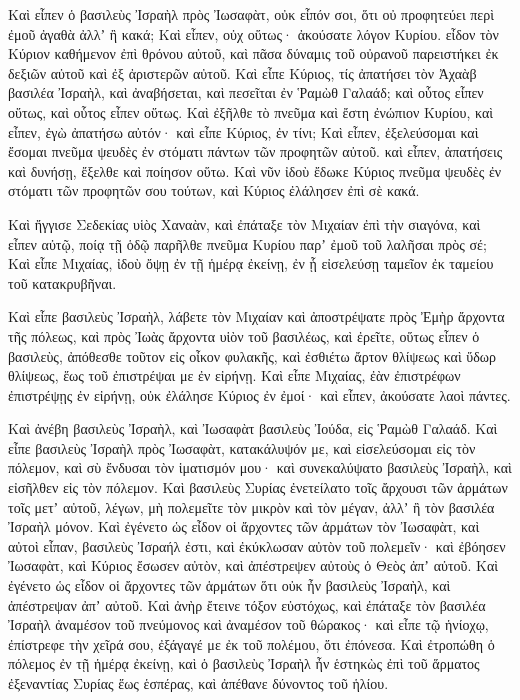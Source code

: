{\par }{\PP {}Καὶ εἶπεν ὁ βασιλεὺς Ἰσραὴλ πρὸς Ἰωσαφὰτ, οὐκ εἶπόν σοι, ὅτι οὐ προφητεύει περὶ ἐμοῦ ἀγαθὰ ἀλλʼ ἢ κακά;
Καὶ εἶπεν, οὐχ οὕτως· ἀκούσατε λόγον Κυρίου. εἶδον τὸν Κύριον καθήμενον ἐπὶ θρόνου αὐτοῦ, καὶ πᾶσα δύναμις τοῦ οὐρανοῦ παρειστήκει ἐκ δεξιῶν αὐτοῦ καὶ ἐξ ἀριστερῶν αὐτοῦ.
Καὶ εἶπε Κύριος, τίς ἀπατήσει τὸν Ἀχαὰβ βασιλέα Ἰσραὴλ, καὶ ἀναβήσεται, καὶ πεσεῖται ἐν Ῥαμὼθ Γαλαάδ; καὶ οὗτος εἶπεν οὕτως, καὶ οὗτος εἶπεν οὕτως.
Καὶ ἐξῆλθε τὸ πνεῦμα καὶ ἔστη ἐνώπιον Κυρίου, καὶ εἶπεν, ἐγὼ ἀπατήσω αὐτόν· καὶ εἶπε Κύριος, ἐν τίνι;
Καὶ εἶπεν, ἐξελεύσομαι καὶ ἔσομαι πνεῦμα ψευδὲς ἐν στόματι πάντων τῶν προφητῶν αὐτοῦ. καὶ εἶπεν, ἀπατήσεις καὶ δυνήσῃ, ἔξελθε καὶ ποίησον οὕτω.
Καὶ νῦν ἰδοὺ ἔδωκε Κύριος πνεῦμα ψευδὲς ἐν στόματι τῶν προφητῶν σου τούτων, καὶ Κύριος ἐλάλησεν ἐπὶ σὲ κακά.
\par }{\PP {}Καὶ ἤγγισε Σεδεκίας υἱὸς Χαναὰν, καὶ ἐπάταξε τὸν Μιχαίαν ἐπὶ τὴν σιαγόνα, καὶ εἶπεν αὐτῷ, ποίᾳ τῇ ὁδῷ παρῆλθε πνεῦμα Κυρίου παρʼ ἐμοῦ τοῦ λαλῆσαι πρὸς σέ;
Καὶ εἶπε Μιχαίας, ἰδοὺ ὄψῃ ἐν τῇ ἡμέρᾳ ἐκείνῃ, ἐν ᾗ εἰσελεύσῃ ταμεῖον ἐκ ταμείου τοῦ κατακρυβῆναι.
\par }{\PP {}Καὶ εἶπε βασιλεὺς Ἰσραὴλ, λάβετε τὸν Μιχαίαν καὶ ἀποστρέψατε πρὸς Ἐμὴρ ἄρχοντα τῆς πόλεως, καὶ πρὸς Ἰωὰς ἄρχοντα υἱὸν τοῦ βασιλέως,
καὶ ἐρεῖτε, οὕτως εἶπεν ὁ βασιλεὺς, ἀπόθεσθε τοῦτον εἰς οἶκον φυλακῆς, καὶ ἐσθιέτω ἄρτον θλίψεως καὶ ὕδωρ θλίψεως, ἕως τοῦ ἐπιστρέψαι με ἐν εἰρήνῃ.
Καὶ εἶπε Μιχαίας, ἐὰν ἐπιστρέφων ἐπιστρέψῃς ἐν εἰρήνῃ, οὐκ ἐλάλησε Κύριος ἐν ἐμοί· καὶ εἶπεν, ἀκούσατε λαοὶ πάντες.
\par }{\PP {}Καὶ ἀνέβη βασιλεὺς Ἰσραὴλ, καὶ Ἰωσαφὰτ βασιλεὺς Ἰούδα, εἰς Ῥαμὼθ Γαλαάδ.
Καὶ εἶπε βασιλεὺς Ἰσραὴλ πρὸς Ἰωσαφὰτ, κατακάλυψόν με, καὶ εἰσελεύσομαι εἰς τὸν πόλεμον, καὶ σὺ ἔνδυσαι τὸν ἱματισμόν μου· καὶ συνεκαλύψατο βασιλεὺς Ἰσραὴλ, καὶ εἰσῆλθεν εἰς τὸν πόλεμον.
Καὶ βασιλεὺς Συρίας ἐνετείλατο τοῖς ἄρχουσι τῶν ἁρμάτων τοῖς μετʼ αὐτοῦ, λέγων, μὴ πολεμεῖτε τὸν μικρὸν καὶ τὸν μέγαν, ἀλλʼ ἢ τὸν βασιλέα Ἰσραὴλ μόνον.
Καὶ ἐγένετο ὡς εἶδον οἱ ἄρχοντες τῶν ἁρμάτων τὸν Ἰωσαφὰτ, καὶ αὐτοὶ εἶπαν, βασιλεὺς Ἰσραήλ ἐστι, καὶ ἐκύκλωσαν αὐτὸν τοῦ πολεμεῖν· καὶ ἐβόησεν Ἰωσαφὰτ, καὶ Κύριος ἔσωσεν αὐτὸν, καὶ ἀπέστρεψεν αὐτοὺς ὁ Θεὸς ἀπʼ αὐτοῦ.
Καὶ ἐγένετο ὡς εἶδον οἱ ἄρχοντες τῶν ἁρμάτων ὅτι οὐκ ἦν βασιλεὺς Ἰσραὴλ, καὶ ἀπέστρεψαν ἀπʼ αὐτοῦ.
Καὶ ἀνὴρ ἔτεινε τόξον εὐστόχως, καὶ ἐπάταξε τὸν βασιλέα Ἰσραὴλ ἀναμέσον τοῦ πνεύμονος καὶ ἀναμέσον τοῦ θώρακος· καὶ εἶπε τῷ ἡνίοχῳ, ἐπίστρεφε τὴν χεῖρά σου, ἐξάγαγέ με ἐκ τοῦ πολέμου, ὅτι ἐπόνεσα.
Καὶ ἐτροπώθη ὁ πόλεμος ἐν τῇ ἡμέρᾳ ἐκείνῃ, καὶ ὁ βασιλεὺς Ἰσραὴλ ἦν ἑστηκὼς ἐπὶ τοῦ ἅρματος ἐξεναντίας Συρίας ἕως ἑσπέρας, καὶ ἀπέθανε δύνοντος τοῦ ἡλίου.

}
